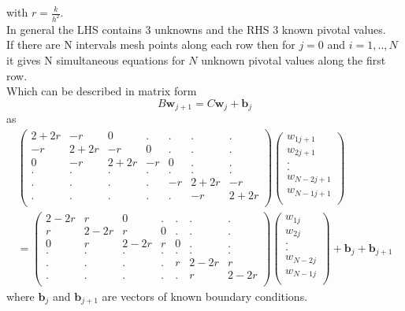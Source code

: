 with $r=\frac{k}{h^2}$.\\
In general the LHS contains $3$ unknowns and the RHS $3$ known pivotal values.\\
If there are N intervals mesh points along each row then for $j=0$ and $i=1,..,N$ it 
gives N simultaneous equations for $N$ unknown pivotal values along the first row.\\
Which can be described in matrix form 
\[ B \mathbf{w}_{j+1}=C\mathbf{w}_{j}+\mathbf{b}_{j}\]
as
\begin{eqnarray*}
\left(\begin{array}{ccccccc}
2+2r&-r&0&.&.&.&.\\
-r&2+2r&-r&0&.&.&.\\
0&-r&2+2r&-r&0&.&.\\
.&.&.&.&.&.&.\\
.&.&.&.&-r&2+2r&-r\\
.&.&.&.&.&-r&2+2r\\
\end{array}\right)
\left(\begin{array}{c}
w_{1j+1}\\
w_{2j+1}\\
.\\
.\\
w_{N-2j+1}\\
w_{N-1j+1}\\
\end{array}\right)\\
=
\left(\begin{array}{ccccccc}
2-2r&r&0&.&.&.&.\\
r&2-2r&r&0&.&.&.\\
0&r&2-2r&r&0&.&.\\
.&.&.&.&.&.&.\\
.&.&.&.&r&2-2r&r\\
.&.&.&.&.&r&2-2r\\
\end{array}\right)
\left(\begin{array}{c}
w_{1j}\\
w_{2j}\\
.\\
.\\
w_{N-2j}\\
w_{N-1j}\\
\end{array}\right)
+\mathbf{b}_j+\mathbf{b}_{j+1}
\end{eqnarray*}
where $\mathbf{b}_j$ and $\mathbf{b}_{j+1}$ are vectors of known boundary conditions. 
